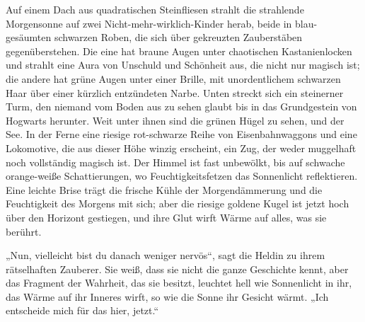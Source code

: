 \later

Auf einem Dach aus quadratischen Steinfliesen strahlt die strahlende Morgensonne auf zwei Nicht-mehr-wirklich-Kinder herab, beide in blau-gesäumten schwarzen Roben, die sich über gekreuzten Zauberstäben gegenüberstehen.
Die eine hat braune Augen unter chaotischen Kastanienlocken und strahlt eine Aura von Unschuld und Schönheit aus, die nicht nur magisch ist; die andere hat grüne Augen unter einer Brille, mit unordentlichem schwarzen Haar über einer kürzlich entzündeten Narbe. Unten streckt sich ein steinerner Turm, den niemand vom Boden aus zu sehen glaubt bis in das Grundgestein von Hogwarts herunter. Weit unter ihnen sind die grünen Hügel zu sehen, und der See. In der Ferne eine riesige rot-schwarze Reihe von Eisenbahnwaggons und eine Lokomotive, die aus dieser Höhe winzig erscheint, ein Zug, der weder muggelhaft noch vollständig magisch ist. Der Himmel ist fast unbewölkt, bis auf schwache orange-weiße Schattierungen, wo Feuchtigkeitsfetzen das Sonnenlicht reflektieren. Eine leichte Brise trägt die frische Kühle der Morgendämmerung und die Feuchtigkeit des Morgens mit sich; aber die riesige goldene Kugel ist jetzt hoch über den Horizont gestiegen, und ihre Glut wirft Wärme auf alles, was sie berührt.

„Nun, vielleicht bist du danach weniger nervös“, sagt die Heldin zu ihrem rätselhaften Zauberer. Sie weiß, dass sie nicht die ganze Geschichte kennt, aber das Fragment der Wahrheit, das sie besitzt, leuchtet hell wie Sonnenlicht in ihr, das Wärme auf ihr Inneres wirft, so wie die Sonne ihr Gesicht wärmt.
„Ich entscheide mich für das hier, jetzt.“

